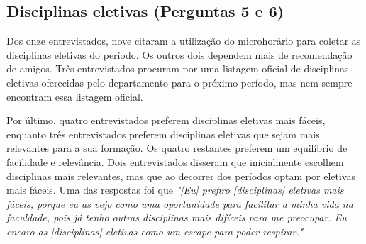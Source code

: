 \subsection{Disciplinas eletivas (Perguntas 5 e 6)}

Dos onze entrevistados, nove citaram a utilização do microhorário para coletar as disciplinas eletivas do período. Os outros dois dependem mais de recomendação de amigos. Três entrevistados procuram por uma listagem oficial de disciplinas eletivas oferecidas pelo departamento para o próximo período, mas nem sempre encontram essa listagem oficial.

Por último, quatro entrevistados preferem disciplinas eletivas mais fáceis, enquanto três entrevistados preferem disciplinas eletivas que sejam mais relevantes para a sua formação. Os quatro restantes preferem um equilíbrio de facilidade e relevância. Dois entrevistados disseram que inicialmente escolhem disciplinas mais relevantes, mas que ao decorrer dos períodos optam por eletivas mais fáceis. Uma das respostas foi que \textit{"[Eu] prefiro [disciplinas] eletivas mais fáceis, porque eu as vejo como uma oportunidade para facilitar a minha vida na faculdade, pois já tenho outras disciplinas mais difíceis para me preocupar. Eu encaro as [disciplinas] eletivas como um escape para poder respirar."}
